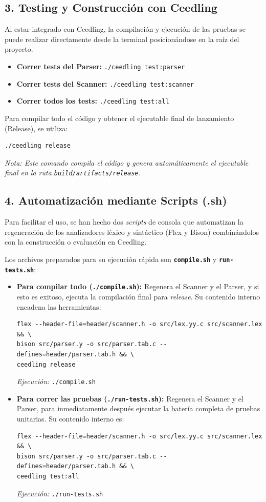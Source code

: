 \documentclass[11pt, a4paper]{article}
\begin{document}
\subsection*{3. Testing y Construcción con Ceedling}
Al estar integrado con Ceedling, la compilación y ejecución de las pruebas se puede realizar directamente desde la terminal posicionándose en la raíz del proyecto.

\begin{itemize}
    \item \textbf{Correr tests del Parser:} \texttt{./ceedling test:parser}
    \item \textbf{Correr tests del Scanner:} \texttt{./ceedling test:scanner}
    \item \textbf{Correr todos los tests:} \texttt{./ceedling test:all}
\end{itemize}

Para compilar todo el código y obtener el ejecutable final de lanzamiento (Release), se utiliza:
\begin{verbatim}
./ceedling release
\end{verbatim}
\textit{Nota: Este comando compila el código y genera automáticamente el ejecutable final en la ruta \texttt{build/artifacts/release}.}

\subsection*{4. Automatización mediante Scripts (.sh)}
Para facilitar el uso, se han hecho dos \textit{scripts} de consola que automatizan la regeneración de los analizadores léxico y sintáctico (Flex y Bison) combinándolos con la construcción o evaluación en Ceedling. 

Los archivos preparados para su ejecución rápida son \textbf{\texttt{compile.sh}} y \textbf{\texttt{run-tests.sh}}:

\begin{itemize}
    \item \textbf{Para compilar todo (\texttt{./compile.sh}):} Regenera el Scanner y el Parser, y si esto es exitoso, ejecuta la compilación final para \textit{release}. Su contenido interno encadena las herramientas:
\begin{verbatim}
flex --header-file=header/scanner.h -o src/lex.yy.c src/scanner.lex && \
bison src/parser.y -o src/parser.tab.c --defines=header/parser.tab.h && \
ceedling release
\end{verbatim}
    \textit{Ejecución:} \texttt{./compile.sh}

    \item \textbf{Para correr las pruebas (\texttt{./run-tests.sh}):} Regenera el Scanner y el Parser, para inmediatamente después ejecutar la batería completa de pruebas unitarias. Su contenido interno es:
\begin{verbatim}
flex --header-file=header/scanner.h -o src/lex.yy.c src/scanner.lex && \
bison src/parser.y -o src/parser.tab.c --defines=header/parser.tab.h && \
ceedling test:all
\end{verbatim}
    \textit{Ejecución:} \texttt{./run-tests.sh}
\end{itemize}
\end{document}
